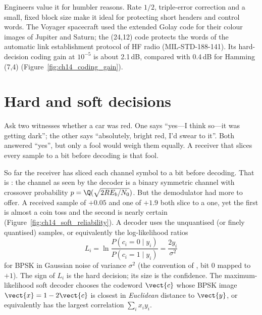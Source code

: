 Engineers value it for humbler reasons. Rate $1/2$, triple-error correction and a small, fixed
block size make it ideal for protecting short headers and control words. The Voyager spacecraft
used the extended Golay code for their colour images of Jupiter and Saturn; the (24,12) code
protects the words of the automatic link establishment protocol of HF radio
(MIL-STD-188-141). Its hard-decision coding gain at $10^{-5}$ is about 2.1\,dB, compared with
0.4\,dB for Hamming (7,4) (Figure~\ref{fig:ch14_coding_gain}).


\section{Hard and soft decisions}
\label{sec:ch14:softhard}

Ask two witnesses whether a car was red. One says ``yes---I think so---it was getting dark''; the
other says ``absolutely, bright red, I'd swear to it''. Both answered ``yes'', but only a fool would
weigh them equally. A receiver that slices every sample to a bit before decoding is that fool.

So far the receiver has sliced each channel symbol to a bit before decoding. That is
: the channel as seen by the decoder is a binary symmetric channel
with crossover probability $p=\Q(\sqrt{2RE_b/N_0})$. But the demodulator had more to offer. A
received sample of $+0.05$ and one of $+1.9$ both slice to a one, yet the first is almost a coin
toss and the second is nearly certain (Figure~\ref{fig:ch14_soft_reliability}). A
 decoder uses the unquantised (or finely quantised) samples, or equivalently the
log-likelihood ratios
\begin{equation}
L_i=\ln\frac{P(c_i=0\mid y_i)}{P(c_i=1\mid y_i)}=\frac{2y_i}{\sigma^2}
\label{eq:ch14:llr}
\end{equation}
for BPSK in Gaussian noise of variance $\sigma^2$ (the convention of , bit 0 mapped to
$+1$). The sign of $L_i$ is the hard decision; its size is the confidence. The maximum-likelihood
soft decoder chooses the codeword $\vect{c}$ whose BPSK image $\vect{x}=1-2\vect{c}$ is closest in
\emph{Euclidean} distance to $\vect{y}$, or equivalently has the largest correlation $\sum_i x_iy_i$.

